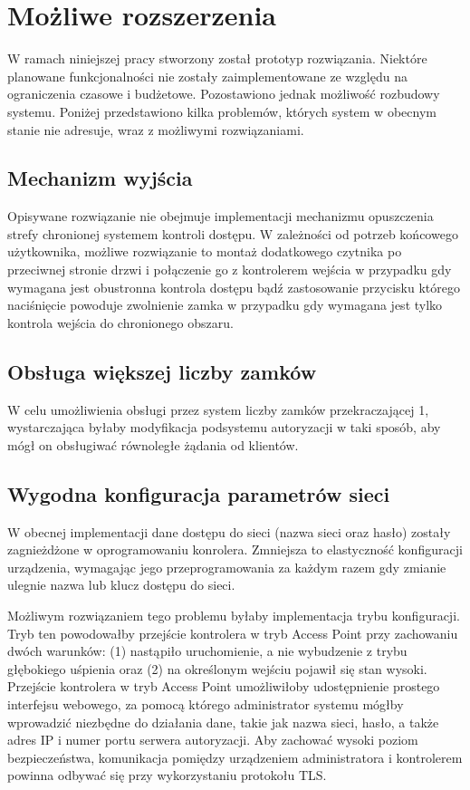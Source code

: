	\section{Możliwe rozszerzenia}

        W ramach niniejszej pracy stworzony został prototyp rozwiązania. Niektóre planowane funkcjonalności nie zostały zaimplementowane ze względu na ograniczenia czasowe i budżetowe. Pozostawiono jednak możliwość rozbudowy systemu. Poniżej przedstawiono kilka problemów, których system w obecnym stanie nie adresuje, wraz z możliwymi rozwiązaniami.

        \subsection{Mechanizm wyjścia}

            Opisywane rozwiązanie nie obejmuje implementacji mechanizmu opuszczenia strefy chronionej systemem kontroli dostępu. W zależności od potrzeb końcowego użytkownika, możliwe rozwiązanie to montaż dodatkowego czytnika po przeciwnej stronie drzwi i połączenie go z kontrolerem wejścia w przypadku gdy wymagana jest obustronna kontrola dostępu bądź zastosowanie przycisku którego naciśnięcie powoduje zwolnienie zamka w przypadku gdy wymagana jest tylko kontrola wejścia do chronionego obszaru.

        \subsection{Obsługa większej liczby zamków}

            W celu umożliwienia obsługi przez system liczby zamków przekraczającej 1, wystarczająca byłaby modyfikacja podsystemu autoryzacji w taki sposób, aby mógł on obsługiwać równoległe żądania od klientów.

        \subsection{Wygodna konfiguracja parametrów sieci}

            W obecnej implementacji dane dostępu do sieci (nazwa sieci oraz hasło) zostały zagnieżdżone w oprogramowaniu konrolera. Zmniejsza to elastyczność konfiguracji urządzenia, wymagając jego przeprogramowania za każdym razem gdy zmianie ulegnie nazwa lub klucz dostępu do sieci.

            Możliwym rozwiązaniem tego problemu byłaby implementacja trybu konfiguracji. Tryb ten powodowałby przejście kontrolera w tryb Access Point przy zachowaniu dwóch warunków: (1) nastąpiło uruchomienie, a nie wybudzenie z trybu głębokiego uśpienia oraz (2) na określonym wejściu pojawił się stan wysoki. Przejście kontrolera w tryb Access Point umożliwiłoby udostępnienie prostego interfejsu webowego, za pomocą którego administrator systemu mógłby wprowadzić niezbędne do działania dane, takie jak nazwa sieci, hasło, a także adres IP i numer portu serwera autoryzacji. Aby zachować wysoki poziom bezpieczeństwa, komunikacja pomiędzy urządzeniem administratora i kontrolerem powinna odbywać się przy wykorzystaniu protokołu TLS.

